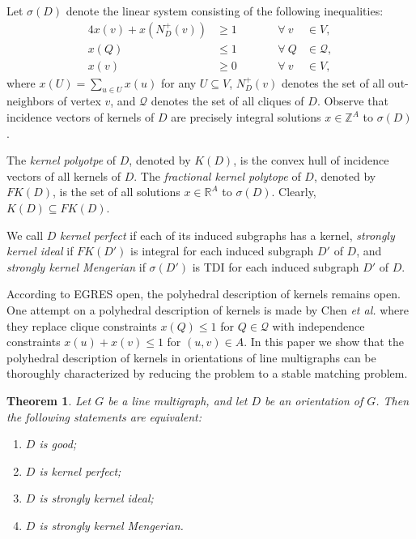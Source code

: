 \documentclass[11pt]{article}
\newtheorem{theorem}{Theorem}%
\numberwithin{theorem}{section}
\begin{document}
Let $\sigma(D)$ denote the linear system consisting of the following inequalities:
\begin{alignat}{4}
x(v)+x(N^+_{D}(v)) &\geq 1 &\qquad &\forall ~ v~&\in V, \label{domination constraints}\\
x(Q)&\leq 1 &\qquad &\forall ~ Q &\in \mathcal{Q}, \label{independence constraints}\\
x(v) &\geq 0 &\qquad &\forall ~ v~&\in V, \label{vertex nonnegativity}
\end{alignat}
where $x(U)=\sum_{u\in U}x(u)$ for any $U\subseteq V$, $N_D^+(v)$ denotes the set of all out-neighbors of vertex $v$, and $\mathcal{Q}$ denotes the set of all cliques of $D$. Observe that incidence vectors of kernels of $D$ are precisely integral solutions $x\in \mathbb{Z}^A$ to $\sigma(D)$.

The \textit{kernel polyotpe} of $D$, denoted by $K(D)$, is the convex hull of incidence vectors of all kernels of $D$.  The \textit{fractional kernel polytope} of $D$, denoted by $FK(D)$, is the set of all solutions $x\in \mathbb{R}^A$ to $\sigma(D)$. Clearly, $K(D)\subseteq FK(D)$.

We call $D$ \textit{kernel perfect} if each of its induced subgraphs has a kernel, \textit{strongly kernel ideal} if $FK(D')$ is integral for each induced subgraph $D'$ of $D$, and \textit{strongly kernel Mengerian} if $\sigma(D')$ is TDI for each induced subgraph $D'$ of $D$.

According to EGRES open, the polyhedral description of kernels remains open. One attempt on a polyhedral description of kernels is made by Chen \textit{et al.} \cite{ChenChen16} where they replace clique constraints $x(Q)\leq 1$ for $Q\in\mathcal{Q}$ with independence constraints $x(u)+x(v)\leq 1$ for $(u,v)\in A$. In this paper we show that the polyhedral description of kernels in orientations of line multigraphs can be thoroughly characterized by reducing the problem to a stable matching problem.

\begin{theorem}
\label{thm:main}
Let $G$ be a line multigraph, and let $D$ be an orientation of $G$. Then the following statements are equivalent:
\begin{enumerate}[label={\emph{(}\roman*\emph{)}}]
	\item $D$ is good;
	\item $D$ is kernel perfect;
	\item $D$ is strongly kernel ideal;
	\item $D$ is strongly kernel Mengerian.
\end{enumerate}
\end{theorem}
\end{document}
